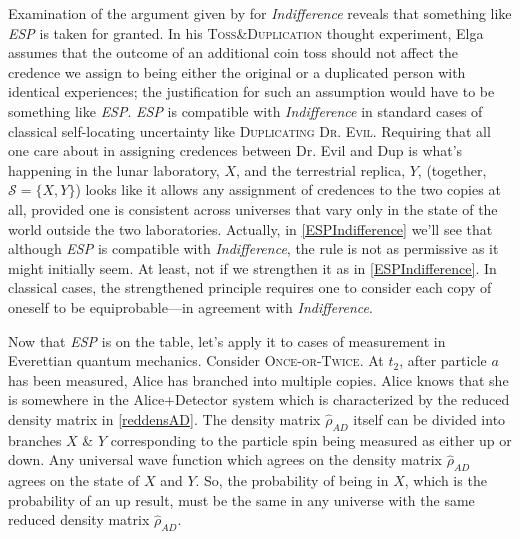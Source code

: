 \documentclass[12pt,onecolumn,secnumarabic,amsmath,amssymb,balancelastpage,nofootinbib]{article}
\begin{document}
Examination of the argument given by \citet{elga2004} for \emph{Indifference} reveals that something like \emph{ESP} is taken for granted. In his \textsc{Toss\&Duplication} thought experiment, Elga assumes that the outcome of an additional coin toss should not affect the credence we assign to being either the original or a duplicated person with identical experiences; the justification for such an assumption would have to be something like \emph{ESP}. \emph{ESP} is compatible with \emph{Indifference} in standard cases of classical self-locating uncertainty like \textsc{Duplicating Dr. Evil}.  Requiring that all one care about in assigning credences between Dr. Evil and Dup is what's happening in the lunar laboratory, $X$, and the terrestrial replica, $Y$, (together, $\mathcal{S}=\{X,Y\}$) looks like it allows any assignment of credences to the two copies at all, provided one is consistent across universes that vary only in the state of the world outside the two laboratories.  Actually, in \textsection \ref{ESPIndifference} we'll see that although \emph{ESP} is compatible with \emph{Indifference}, the rule is not as permissive as it might initially seem.  At least, not if we strengthen it as in \textsection \ref{ESPIndifference}.  In classical cases, the strengthened principle requires one to consider each copy of oneself to be equiprobable---in agreement with \emph{Indifference}.

Now that \emph{ESP} is on the table, let's apply it to cases of measurement in Everettian quantum mechanics.  Consider \textsc{Once-or-Twice}.  At $t_2$, after particle $a$ has been measured, Alice has branched into multiple copies.  Alice knows that she is somewhere in the Alice+Detector system which is characterized by the reduced density matrix in \eqref{reddensAD}.  The density matrix $\widehat{\rho}_{AD}$ itself can be divided into branches $X$ \& $Y$ corresponding to the particle spin being measured as either up or down.  Any universal wave function which agrees on the density matrix $\widehat{\rho}_{AD}$ agrees on the state of $X$ and $Y$.  So, the probability of being in $X$, which is the probability of an up result, must be the same in any universe with the same reduced density matrix $\widehat{\rho}_{AD}$.
\end{document}

